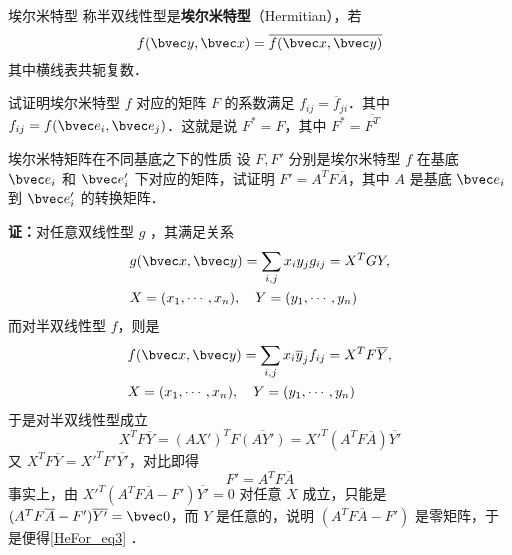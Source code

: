 
\begin{definition}{埃尔米特型}
称半双线性型是\textbf{埃尔米特型}（Hermitian），若
\begin{equation}\label{HeFor_eq2}
f(\bvec y,\bvec x)=\overline{f(\bvec x,\bvec y)}
\end{equation}
其中横线表共轭复数．
\end{definition}
\begin{example}{}
试证明埃尔米特型 $f$ 对应的矩阵 $F$ 的系数满足 $f_{ij}=\overline f_{ji}$．其中 $f_{ij}=f(\bvec e_i,\bvec e_j)$．这就是说 $F^*=F$，其中 $F^*=\overline {F^T}$
\end{example}
\begin{example}{埃尔米特矩阵在不同基底之下的性质}
设 $F,F'$ 分别是埃尔米特型 $f$ 在基底 $\bvec e_i$ 和 $\bvec e'_i$ 下对应的矩阵，试证明 $F'=A^TF\overline A$，其中 $A$ 是基底 $\bvec e_i$ 到 $\bvec e'_i$ 的转换矩阵．

\textbf{证：}对任意双线性型 $g$ ，其满足关系
\begin{equation}
\begin{aligned}
&g(\bvec x,\bvec y)=\sum_{i,j}x_i y_j g_{ij}=X^TGY,\\
&X=(x_1,\cdots,x_n),\quad Y=(y_1,\cdots,y_n)
\end{aligned}
\end{equation}
而对半双线性型 $f$，则是
\begin{equation}\label{HeFor_eq1}
\begin{aligned}
&f(\bvec x,\bvec y)=\sum_{i,j}x_i \overline y_j f_{ij}=X^TF\overline Y,\\
&X=(x_1,\cdots,x_n),\quad Y=(y_1,\cdots,y_n)
\end{aligned}
\end{equation}
于是对半双线性型成立
\begin{equation}
X^TF\overline{Y}=(AX')^TF\overline{(AY')}={X'}^T(A^TF\overline A)\overline{Y'}
\end{equation}
又 $X^T F\overline Y=X'^TF'\overline{Y'}$，对比即得
\begin{equation}\label{HeFor_eq3}
F'=A^TF\overline A
\end{equation}
事实上，由 ${X'}^T(A^TF\overline A-F')\overline{Y'}=0$ 对任意 $X$ 成立，只能是 $(A^TF\overline A-F')\overline{Y'}=\bvec 0$，而 $Y$ 是任意的，说明 $(A^TF\overline A-F')$ 是零矩阵，于是便得\autoref{HeFor_eq3} ．
\end{example}